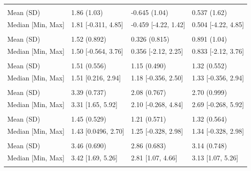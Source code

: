 \documentclass[
]{book}
\begin{document}
\begin{tabular}[t]{llll}
\addlinespace[0.3em]
\multicolumn{4}{l}{\textbf{x5}}\\
\hspace{1em}Mean (SD) & 1.86 (1.03) & -0.645 (1.04) & 0.537 (1.62)\\
\hspace{1em}Median [Min, Max] & 1.81 [-0.311, 4.85] & -0.459 [-4.22, 1.42] & 0.504 [-4.22, 4.85]\\
\addlinespace[0.3em]
\multicolumn{4}{l}{\textbf{x6}}\\
\hspace{1em}Mean (SD) & 1.52 (0.892) & 0.326 (0.815) & 0.891 (1.04)\\
\hspace{1em}Median [Min, Max] & 1.50 [-0.564, 3.76] & 0.356 [-2.12, 2.25] & 0.833 [-2.12, 3.76]\\
\addlinespace[0.3em]
\multicolumn{4}{l}{\textbf{x7}}\\
\hspace{1em}Mean (SD) & 1.51 (0.556) & 1.15 (0.490) & 1.32 (0.552)\\
\hspace{1em}Median [Min, Max] & 1.51 [0.216, 2.94] & 1.18 [-0.356, 2.50] & 1.33 [-0.356, 2.94]\\
\addlinespace[0.3em]
\multicolumn{4}{l}{\textbf{x8}}\\
\hspace{1em}Mean (SD) & 3.39 (0.737) & 2.08 (0.767) & 2.70 (0.999)\\
\hspace{1em}Median [Min, Max] & 3.31 [1.65, 5.92] & 2.10 [-0.268, 4.84] & 2.69 [-0.268, 5.92]\\
\addlinespace[0.3em]
\multicolumn{4}{l}{\textbf{x9}}\\
\hspace{1em}Mean (SD) & 1.45 (0.529) & 1.21 (0.571) & 1.32 (0.564)\\
\hspace{1em}Median [Min, Max] & 1.43 [0.0496, 2.70] & 1.25 [-0.328, 2.98] & 1.34 [-0.328, 2.98]\\
\addlinespace[0.3em]
\multicolumn{4}{l}{\textbf{x10}}\\
\hspace{1em}Mean (SD) & 3.46 (0.690) & 2.86 (0.683) & 3.14 (0.748)\\
\hspace{1em}Median [Min, Max] & 3.42 [1.69, 5.26] & 2.81 [1.07, 4.66] & 3.13 [1.07, 5.26]\\
\addlinespace[0.3em]
\multicolumn{4}{l}{\textbf{x11}}\\

\end{tabular}
\end{document}

